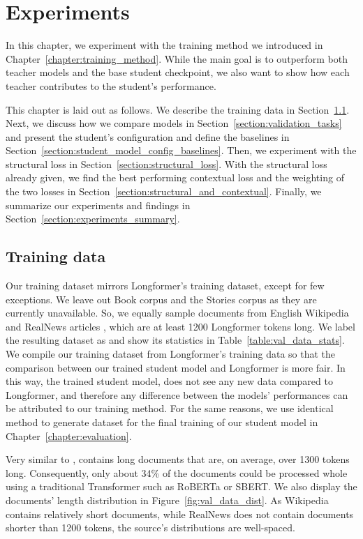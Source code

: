 \chapter{Experiments}\label{chapter:experiments}

In this chapter, we experiment with the training method we introduced in
Chapter~\ref{chapter:training_method}. While the main goal is to outperform
both teacher models and the base student checkpoint, we also want to show how
each teacher contributes to the student's performance.

This chapter is laid out as follows. We describe the training data in
Section~\ref{section:val_training_data}. Next, we discuss how we compare models
in Section~\ref{section:validation_tasks} and present the student's
configuration and define the baselines in
Section~\ref{section:student_model_config_baselines}. Then, we experiment with
the structural loss in Section~\ref{section:structural_loss}. With the
structural loss already given, we find the best performing contextual loss and
the weighting of the two losses in Section~\ref{section:structural_and_contextual}.
Finally, we summarize our experiments and findings in
Section~\ref{section:experiments_summary}.

\section{Training data}\label{section:val_training_data}

Our training dataset mirrors Longformer's training dataset, except for few
exceptions. We leave out Book corpus \citep{zhu2015aligning} and the Stories
corpus \citep{trinh2018simple} as they are currently unavailable. So, we
equally sample documents from English Wikipedia and RealNews articles
\citep{zellers2019defending}, which are at least 1200 Longformer tokens long.
We label the resulting dataset as  and show its statistics in
Table~\ref{table:val_data_stats}. We compile our training dataset from
Longformer's training data so that the comparison between our trained student
model and Longformer is more fair. In this way, the trained student model, does
not see any new data compared to Longformer, and therefore any difference
between the models' performances can be attributed to our training method. For
the same reasons, we use identical method to generate dataset
 for the final training of our student model in
Chapter~\ref{chapter:evaluation}.

Very similar to ,  contains long documents
that are, on average, over 1300 tokens long. Consequently, only about 34\% of
the documents could be processed whole using a traditional Transformer such as
RoBERTa \citep{liu2019roberta} or SBERT. We also display the documents' length
distribution in Figure~\ref{fig:val_data_dist}. As Wikipedia contains
relatively short documents, while RealNews does not contain documents shorter
than 1200 tokens, the source's distributions are well-spaced.

